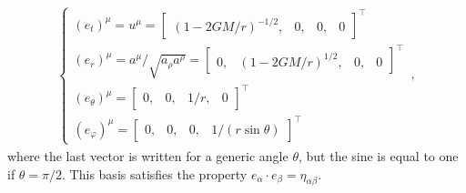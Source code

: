 \documentclass[main.tex]{subfiles}
\begin{document}
\begin{align}
  \begin{cases}
    (e_{t})^{\mu } = u^{\mu } = \left[\begin{array}{cccc}
    (1-2GM/r)^{-1/2}, & 0, & 0, & 0
  \end{array}\right]^{\top} \\ 
    (e_{r})^{\mu } = a^{\mu } / \sqrt{a_{\rho } a^{\rho }}
  = \left[\begin{array}{cccc}
    0, & (1-2GM/r)^{1/2}, & 0, & 0
  \end{array}\right]^{\top}  \\
  (e_{\theta })^{\mu } = \left[\begin{array}{cccc}
  0, & 0, & 1/r, & 0
  \end{array}\right]^{\top} \\
  (e_{\varphi })^{\mu } = \left[\begin{array}{cccc}
  0, & 0, & 0, & 1/(r \sin \theta )
  \end{array}\right]^{\top}
\end{cases} 
\,,
\end{align}
%
where the last vector is written for a generic angle \(\theta \), but the sine is equal to one if \(\theta = \pi /2\). 
This basis satisfies the property \(e_{\alpha } \cdot e_{\beta } = \eta_{\alpha \beta }\). 
\end{document}
